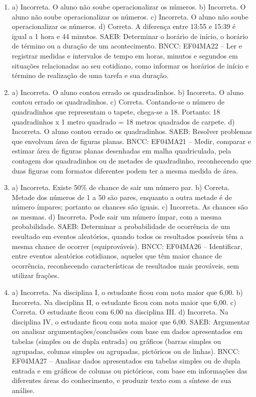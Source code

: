 \begin{enumerate}
\item
a) Incorreta. O aluno não soube operacionalizar os números.
b) Incorreta. O aluno não soube operacionalizar os números.
c) Incorreta. O aluno não soube operacionalizar os números.
d) Correta. A diferença entre 13:55 e 15:39 é igual a 1 hora e 44 minutos.
SAEB: Determinar o horário de início, o horário de término ou
a duração de um acontecimento.
BNCC: EF04MA22 -- Ler e registrar medidas e intervalos de tempo em horas, minutos e segundos em
situações relacionadas ao seu cotidiano, como informar os horários de início e término de realização
de uma tarefa e sua duração.

\item
a) Incorreta. O aluno contou errado os quadradinhos.
b) Incorreta. O aluno contou errado os quadradinhos.
c) Correta. Contando-se o número de quadradinhos que representam o tapete, chega-se a 18. Portanto: 18 quadradinhos x 1 metro quadrado = 18 metros quadrados de carpete.
d) Incorreta. O aluno contou errado os quadradinhos.
SAEB: Resolver problemas que envolvam área de figuras planas.
BNCC: EF04MA21 -- Medir, comparar e estimar área de figuras planas desenhadas em malha quadriculada,
pela contagem dos quadradinhos ou de metades de quadradinho, reconhecendo que duas figuras
com formatos diferentes podem ter a mesma medida de área.

\item
a) Incorreta. Existe 50\% de chance de sair um número par.
b) Correta. Metade dos números de 1 a 50 são pares, enquanto a outra metade é de número ímpares; portanto as chances são iguais.
c) Incorreta. As chances são as mesmas.
d) Incorreta. Pode sair um número ímpar, com a mesma probabilidade.
SAEB: Determinar a probabilidade de ocorrência de um
resultado em eventos aleatórios, quando todos os resultados possíveis
têm a mesma chance de ocorrer (equiprováveis).
BNCC: EF04MA26 -- Identificar, entre eventos aleatórios cotidianos, aqueles que têm maior chance de
ocorrência, reconhecendo características de resultados mais prováveis, sem utilizar frações.

\item
a) Incorreta. Na disciplina I, o estudante ficou com nota maior que 6,00.
b) Incorreta. Na disciplina II, o estudante ficou com nota maior que 6,00.
c) Correta. O estudante ficou com 6,00 na disciplina III.
d) Incorreta. Na disciplina IV, o estudante ficou com nota maior que 6,00.
SAEB: Argumentar ou analisar argumentações/conclusões com
base em dados apresentados em tabelas (simples ou de dupla entrada) ou
gráficos (barras simples ou agrupadas, colunas simples ou agrupadas,
pictóricos ou de linhas).
BNCC: EF04MA27 -- Analisar dados apresentados em tabelas simples ou de dupla entrada e em gráficos de
colunas ou pictóricos, com base em informações das diferentes áreas do conhecimento, e produzir
texto com a síntese de sua análise.


\end{enumerate}

